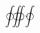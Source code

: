 \documentclass {minimal}
\begin{document}
\begin {align}
{\oint \kern -1mm }{\oiint}{\varointctrclockwise \kern 20mm } {}
\end {align}
\end{document}
